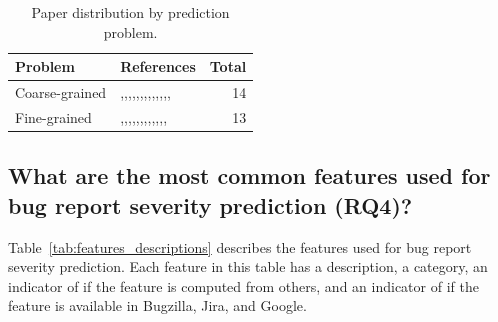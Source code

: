 \begin{table}[h!]
  \vspace{30pt}
  \centering
  \captionsetup{type=table}
  \caption{Paper distribution by prediction problem.}
  \small
  \begin{tabular}{@{}lp{10cm}r@{}}
    \toprule
    \textbf{Problem} & \textbf{References} & \textbf{Total} \\
    \midrule
    Coarse-grained & \cite{Lamkanfi:2010},\cite{Lamkanfi:2011},\cite{Yang:2012},\cite{Yang:2014a},\cite{Roy:2014},\cite{Valdivia:2014},\cite{Sharma:2015},\cite{Gujral:2015},\cite{Xia:2015},\cite{Otoom:2016},\cite{Jin:2016a},\cite{Jin:2016b},\cite{Saha:2015},\cite{Jin:2016c} & 14 \\
    Fine-grained & \cite{Tian:2012},\cite{Chaturvedi:2012},\cite{Yang:2014b},\cite{Meera:2014},\cite{Zhang:2015},\cite{Pushpalathas:2016},\cite{Sabor:2016},\cite{Tian:2016},\cite{Zhang:2016},\cite{Choeikiwong:2016},\cite{Singh:2017},\cite{Yang:2017},\cite{Roy:2017} & 13 \\
    \bottomrule
  \end{tabular} 
  \label{tab:prediction_problem_type_by_paper}
\end{table}

\subsection{What are the most common features used for bug report severity prediction (RQ4)?}\label{subsec:rq4_result}

Table~\ref{tab:features_descriptions} describes the features used for bug report severity prediction. Each feature in this table has a description, a category, an indicator of if the feature is computed from others, and an indicator of if the feature is available in Bugzilla, Jira, and Google.

